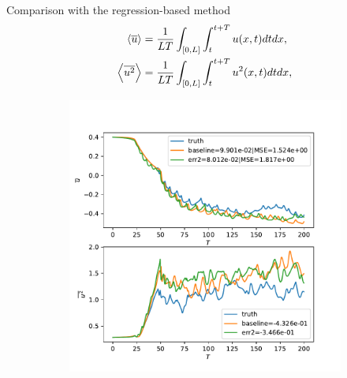 \documentclass[aspectratio=169]{beamer}
\begin{document}
\begin{frame}{Comparison with the regression-based method}
	\begin{equation*}
		\begin{aligned}
			\left\langle\overline{u}\right\rangle &= \frac{1}{LT}\int_{[0, L]}\int_{t}^{t+T} u(x, t)dt dx,
			\\
			\left\langle\overline{u^2}\right\rangle &= \frac{1}{LT}\int_{[0, L]}\int_{t}^{t+T}
			u^2(x, t)dt dx, \\
		\end{aligned}
	\end{equation*}
	\begin{figure}[ht]
		\centering
		\begin{subfigure}[b]{0.38\textwidth}
				\centering
				\includegraphics[width=\textwidth]
				{fig/ks_nu1_N1023n10_regression_cmp_stats.pdf}
		\end{subfigure}
		\begin{subfigure}[b]{0.38\textwidth}
				\centering

\end{subfigure}
\end{figure}
\end{frame}
\end{document}
